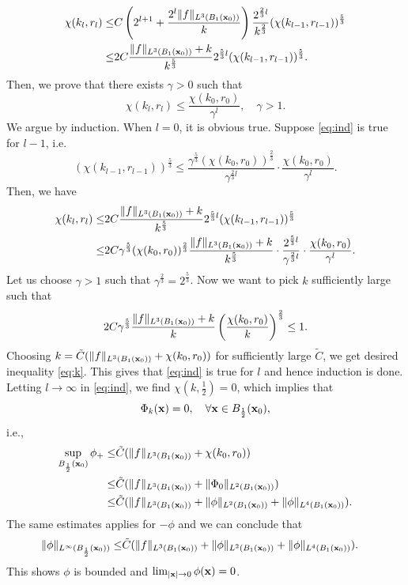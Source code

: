 \documentclass{elsarticle}
\newcommand{\be}{\begin{equation}}
\newcommand{\ee}{\end{equation}}
\newcommand{\bx}{{\bf x} }
\begin{document}
\begin{align*}
\chi(k_l,r_l)\leq &C\left(2^{l+1}+\frac{2^l\|f\|_{L^3(B_1(\bx_0))}}{k}\right)\frac{2^{\frac{2}{3}l}}{k^{\frac23}}(\chi(k_{l-1},r_{l-1}))^{\frac53}\\
\leq&2C\frac{\|f\|_{L^3(B_1(\bx_0))}+k}{k^{\frac{5}{3}}}2^{\frac{5}{3}l}(\chi(k_{l-1},r_{l-1}))^{\frac53}.
\end{align*}
Then, we prove that there exists $\gamma>0$ such that
\be\label{eq:ind}
\chi(k_l,r_l)\leq \frac{\chi(k_0,r_0)}{\gamma^l},\quad \gamma>1.
\ee
We argue by induction. When $l=0$, it is obvious true. Suppose \eqref{eq:ind} is true for $l-1$, i.e.
\begin{equation*}
(\chi(k_{l-1},r_{l-1}))^{\frac53}\leq   \frac{\gamma^{\frac53}(\chi(k_0,r_0))^{\frac23}}{\gamma^{\frac23l}}   \cdot  \frac{\chi(k_0,r_0)}{\gamma^{l}}.
\end{equation*}
Then, we have
\begin{align*}
\chi(k_{l},r_{l})\leq &2C\frac{\|f\|_{L^3(B_1(\bx_0))}+k}{k^{\frac{5}{3}}}2^{\frac{5}{3}l}(\chi(k_{l-1},r_{l-1}))^{\frac53}\\
\leq &2C\gamma^{\frac53}(\chi(k_0,r_0))^{\frac23}\frac{\|f\|_{L^3(B_1(\bx_0))}+k}{k^{\frac{5}{3}}}\cdot\frac{2^{\frac{5}{3}l}}{\gamma^{\frac23l}} \cdot\frac{\chi(k_0,r_0)}{\gamma^{l}}.
\end{align*}
Let us choose $\gamma>1$ such that $\gamma^{\frac23}=2^{\frac53}$. Now we want to pick $k$ sufficiently large such that
\be\label{eq:k}
2C\gamma^{\frac53}\frac{\|f\|_{L^3(B_1(\bx_0))}+k}{k}\left(\frac{\chi(k_0,r_0)}{k}\right)^{\frac23}\leq1.
\ee
Choosing $k=\tilde{C}(\|f\|_{L^3(B_1(\bx_0))}+\chi(k_0,r_0))$ for sufficiently large $\tilde{C}$, we get desired inequality \eqref{eq:k}. This gives that
\eqref{eq:ind} is true for $l$ and hence induction is done. Letting $l\to\infty$ in \eqref{eq:ind}, we find  $\chi(k,\frac12)=0$, which implies that
\be
\Phi_k(\bx)=0,\quad \forall \bx\in B_{\frac12}(\bx_0),
\ee
i.e.,
\begin{align*}
\sup_{B_{\frac12}(\bx_0)} \phi_+\leq& \tilde{C}(\|f\|_{L^3(B_1(\bx_0))}+\chi(k_0,r_0))\\
\leq& \tilde{C}(\|f\|_{L^3(B_1(\bx_0))}+\|\Phi_0\|_{L^2(B_1(\bx_0))})\\
\leq&
\tilde{C}(\|f\|_{L^3(B_1(\bx_0))}+\|\phi\|_{L^2(B_1(\bx_0))}+\|\phi\|_{L^4(B_1(\bx_0))}).
\end{align*}
The same estimates applies for $-\phi$ and we can conclude that
\begin{align*}
\|\phi\|_{L^\infty(B_{\frac12}(\bx_0))}
\leq&
\tilde{C}(\|f\|_{L^3(B_1(\bx_0))}+\|\phi\|_{L^2(B_1(\bx_0))}+\|\phi\|_{L^4(B_1(\bx_0))}).
\end{align*}
This shows $\phi$ is bounded and $\lim_{|\bx|\to0}\phi(\bx)=0$.
\end{document}
